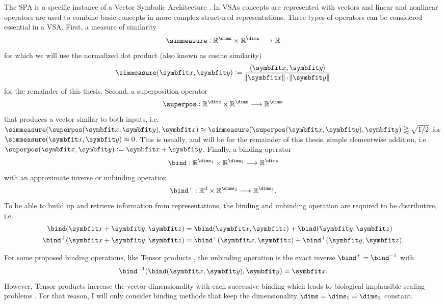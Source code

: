 The SPA is a specific instance of a Vector Symbolic Architecture \parencite[VSA;][]{gayler2004}.
In VSAs concepts are represented with vectors and linear and nonlinear operators are used to combine basic concepts in more complex structured representations.
Three types of operators can be considered essential in a VSA\@.
First, a measure of similarity
\begin{equation}
    \simmeasure: \mathbb{R}^{\dims} \times \mathbb{R}^{\dims} \longrightarrow \mathbb{R}
\end{equation}
for which we will use the normalized dot product (also known as cosine similarity)
\begin{equation}
    \simmeasure(\vc x, \vc y) := \frac{\left\langle \vc x, \vc y \right\rangle}{\norm{\vc x} \cdot \norm{\vc y}}
\end{equation}
for the remainder of this thesis.
Second, a superposition operator
\begin{equation}
    \superpos: \mathbb{R}^{\dims} \times \mathbb{R}^{\dims} \longrightarrow \mathbb{R}^{\dims}
\end{equation}
that produces a vector similar to both inputs, i.e.\ $\simmeasure(\superpos(\vc x, \vc y), \vc x) \approx \simmeasure(\superpos(\vc x, \vc y), \vc y) \gtrapprox \sqrt{1/2}$ for $\simmeasure(\vc x, \vc y) \approx 0$.
This is usually, and will be for the remainder of this thesis, simple elementwise addition, i.e. $\superpos(\vc x, \vc y) := \vc x + \vc y$.
Finally, a binding operator
\begin{equation}
    \bind: \mathbb{R}^{\dims_1} \times \mathbb{R}^{\dims_2} \longrightarrow \mathbb{R}^{\dims}
\end{equation}
with an approximate inverse or unbinding operation
\begin{equation}
    \bind^+: \mathbb{R}^d \times \mathbb{R}^{\dims_2} \longrightarrow \mathbb{R}^{\dims_1} \text{.}
\end{equation}
To be able to build up and retrieve information from representations, the binding and unbinding operation are required to be distributive, i.e.
\begin{align}
    \bind(\vc x + \vc y, \vc z) &= \bind(\vc x, \vc z) + \bind(\vc y, \vc z) \\
    \bind^+(\vc x + \vc y, \vc z) &= \bind^+(\vc x, \vc z) + \bind^+(\vc y, \vc z) \text{.}
\end{align}

For some proposed binding operations, like Tensor products \parencite{smolensky1990}, the unbinding operation is the exact inverse $\bind^+ = \bind^{-1}$ with
\begin{equation*}
    \bind^{-1}(\bind(\vc x, \vc y), \vc y) = \vc x \text{.}
\end{equation*}
However, Tensor products increase the vector dimensionality with each successive binding which leads to biological implausible scaling problems \parencite[Appendix D.5]{eliasmith2013}.
For that reason, I will only consider binding methods that keep the dimensionality $\dims = \dims_1 = \dims_2$ constant.

